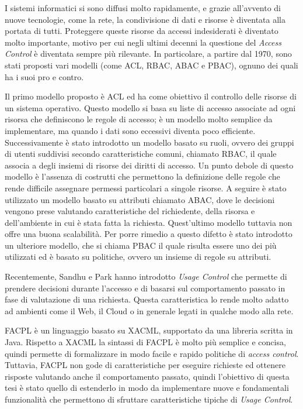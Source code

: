 

I sistemi informatici si sono diffusi molto rapidamente, e grazie all'avvento di nuove tecnologie, come la rete, la condivisione di dati e risorse è diventata alla portata di tutti. Proteggere queste risorse da accessi 
indesiderati è diventato molto importante, motivo per cui negli ultimi decenni la questione 
del \textit{Access Control} è diventata sempre più rilevante.
In particolare,
a partire dal 1970, sono stati proposti vari modelli (come \ac{ACL},
\ac{RBAC}, \ac{ABAC} e \ac{PBAC}), ognuno dei quali ha i suoi pro e contro.


Il primo modello proposto è \ac{ACL} ed ha come obiettivo il controllo delle risorse di un sistema operativo. Questo modello si basa su liste di accesso associate
ad ogni risorsa che definiscono le regole di accesso; è un modello molto
semplice da implementare, ma quando i dati sono eccessivi diventa
poco efficiente. 
Successivamente è stato introdotto un modello basato su
ruoli, ovvero dei gruppi
di utenti suddivisi secondo caratteristiche comuni, chiamato \ac{RBAC}, il quale associa a degli insiemi di risorse dei diritti di accesso. Un punto debole
di questo modello è l'assenza di costrutti che permettono la definizione
delle regole che rende difficile assegnare permessi particolari a singole
risorse. A seguire è stato utilizzato un modello basato su attributi chiamato \ac{ABAC}, dove
le decisioni vengono prese valutando caratteristiche del richiedente,
della risorsa e dell’ambiente in cui è stata fatta la richiesta. Quest’ultimo
modello tuttavia non offre una buona scalabilità. Per porre
rimedio a questo difetto è stato introdotto un ulteriore modello, che si chiama \ac{PBAC}
il quale risulta essere uno dei più utilizzati ed è basato su politiche, 
ovvero un insieme di regole su attributi. 

Recentemente, Sandhu e Park \cite{ucon}
hanno introdotto \textit{Usage Control}
che permette di prendere decisioni durante
l’accesso e di basarsi sul comportamento passato in fase di valutazione
di una richiesta. Questa caratteristica lo rende molto adatto ad ambienti come il Web,
il Cloud o in generale legati in qualche modo alla rete. \par

\ac{FACPL} è un linguaggio basato su \ac{XACML}, supportato da una libreria
scritta in Java. Rispetto a \ac{XACML} la sintassi di \ac{FACPL} è molto più semplice
e concisa, quindi permette di formalizzare in modo facile e rapido
politiche di \textit{access control}. Tuttavia, \ac{FACPL} non gode di caratteristiche
per eseguire richieste ed ottenere risposte valutando
anche il comportamento passato, quindi l’obiettivo di questa tesi è stato
quello di estenderlo in modo da implementare nuove e fondamentali funzionalità
che permettono di sfruttare caratteristiche tipiche di \textit{Usage Control}.  \par

